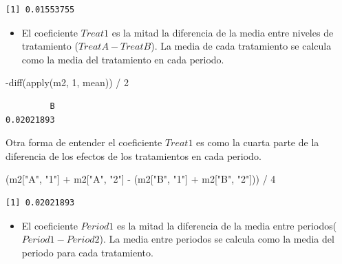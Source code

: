 \documentclass[
  12pt,
  a4paper,
  extrafontsizes,
  onecolumn,
  openright,
  table]{memoir}
\newenvironment{Shaded}{\begin{snugshade}}{\end{snugshade}}
\newcommand{\DecValTok}[1]{\textcolor[rgb]{0.68,0.00,0.00}{#1}}
\newcommand{\FunctionTok}[1]{\textcolor[rgb]{0.28,0.35,0.67}{#1}}
\newcommand{\NormalTok}[1]{\textcolor[rgb]{0.00,0.23,0.31}{#1}}
\newcommand{\SpecialCharTok}[1]{\textcolor[rgb]{0.37,0.37,0.37}{#1}}
\newcommand{\StringTok}[1]{\textcolor[rgb]{0.13,0.47,0.30}{#1}}
\providecommand{\tightlist}{%
  \setlength{\itemsep}{0pt}\setlength{\parskip}{0pt}}\usepackage{longtable,booktabs,array}
\begin{document}
\begin{verbatim}
[1] 0.01553755
\end{verbatim}

\normalsize

\begin{itemize}
\tightlist
\item
  El coeficiente \(Treat1\) es la mitad la diferencia de la media entre
  niveles de tratamiento (\(TreatA-TreatB\)). La media de cada
  tratamiento se calcula como la media del tratamiento en cada periodo.
\end{itemize}

\scriptsize

\begin{Shaded}
\begin{Highlighting}[]
\SpecialCharTok{{-}}\FunctionTok{diff}\NormalTok{(}\FunctionTok{apply}\NormalTok{(m2, }\DecValTok{1}\NormalTok{, mean)) }\SpecialCharTok{/} \DecValTok{2}
\end{Highlighting}
\end{Shaded}

\begin{verbatim}
         B 
0.02021893 
\end{verbatim}

\normalsize

Otra forma de entender el coeficiente \(Treat1\) es como la cuarta parte
de la diferencia de los efectos de los tratamientos en cada periodo.

\scriptsize

\begin{Shaded}
\begin{Highlighting}[]
\NormalTok{(m2[}\StringTok{"A"}\NormalTok{, }\StringTok{"1"}\NormalTok{] }\SpecialCharTok{+}\NormalTok{ m2[}\StringTok{"A"}\NormalTok{, }\StringTok{"2"}\NormalTok{] }\SpecialCharTok{{-}}\NormalTok{ (m2[}\StringTok{"B"}\NormalTok{, }\StringTok{"1"}\NormalTok{] }\SpecialCharTok{+}\NormalTok{ m2[}\StringTok{"B"}\NormalTok{, }\StringTok{"2"}\NormalTok{])) }\SpecialCharTok{/} \DecValTok{4}
\end{Highlighting}
\end{Shaded}

\begin{verbatim}
[1] 0.02021893
\end{verbatim}

\normalsize

\begin{itemize}
\tightlist
\item
  El coeficiente \(Period1\) es la mitad la diferencia de la media entre
  periodos(\(Period1 - Period2\)). La media entre periodos se calcula
  como la media del periodo para cada tratamiento.
\end{itemize}
\end{document}
